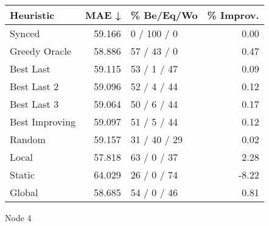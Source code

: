 \begin{tabular}{lrlr}
\toprule
\textbf{Heuristic} & \textbf{MAE ↓} & \textbf{\% Be/Eq/Wo} & \textbf{\% Improv.} \\
\midrule
            Synced &         59.166 &          0 / 100 / 0 &                0.00 \\
     Greedy Oracle &         58.886 &          57 / 43 / 0 &                0.47 \\
         Best Last &         59.115 &          53 / 1 / 47 &                0.09 \\
       Best Last 2 &         59.096 &          52 / 4 / 44 &                0.12 \\
       Best Last 3 &         59.064 &          50 / 6 / 44 &                0.17 \\
    Best Improving &         59.097 &          51 / 5 / 44 &                0.12 \\
            Random &         59.157 &         31 / 40 / 29 &                0.02 \\
             Local &         57.818 &          63 / 0 / 37 &                2.28 \\
            Static &         64.029 &          26 / 0 / 74 &               -8.22 \\
            Global &         58.685 &          54 / 0 / 46 &                0.81 \\
\bottomrule
\end{tabular}
\caption{Node 4}
\label{tab:iid_lr01_le1_bs2_4}
